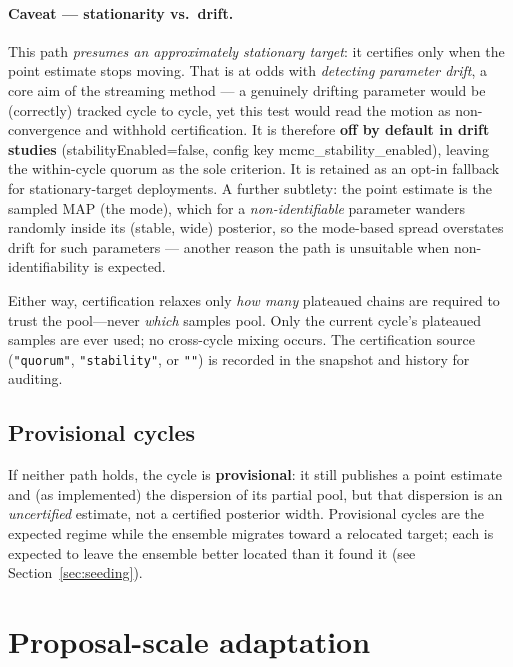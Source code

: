 \documentclass[11pt]{article}
\newcommand{\code}[1]{\texttt{\small #1}}
\newcommand{\param}[1]{\textsf{#1}}
\begin{document}
\paragraph{Caveat --- stationarity vs.\ drift.} This path
\emph{presumes an approximately stationary target}: it certifies only when
the point estimate stops moving. That is at odds with \emph{detecting
parameter drift}, a core aim of the streaming method --- a genuinely
drifting parameter would be (correctly) tracked cycle to cycle, yet this
test would read the motion as non-convergence and withhold certification.
It is therefore \textbf{off by default in drift studies}
(\param{stabilityEnabled}=false, config key
\param{mcmc\_stability\_enabled}), leaving the within-cycle quorum as the
sole criterion. It is retained as an opt-in fallback for
stationary-target deployments. A further subtlety: the point estimate is
the sampled MAP (the mode), which for a \emph{non-identifiable} parameter
wanders randomly inside its (stable, wide) posterior, so the mode-based
spread overstates drift for such parameters --- another reason the path is
unsuitable when non-identifiability is expected.

Either way, certification relaxes only \emph{how many} plateaued chains
are required to trust the pool---never \emph{which} samples pool. Only the
current cycle's plateaued samples are ever used; no cross-cycle mixing
occurs. The certification source (\code{"quorum"}, \code{"stability"}, or
\code{""}) is recorded in the snapshot and history for auditing.

\subsection{Provisional cycles}
If neither path holds, the cycle is \textbf{provisional}: it still
publishes a point estimate and (as implemented) the dispersion of its
partial pool, but that dispersion is an \emph{uncertified} estimate, not
a certified posterior width. Provisional cycles are the expected regime
while the ensemble migrates toward a relocated target; each is expected
to leave the ensemble better located than it found it (see
Section~\ref{sec:seeding}).

\section{Proposal-scale adaptation}
\end{document}
